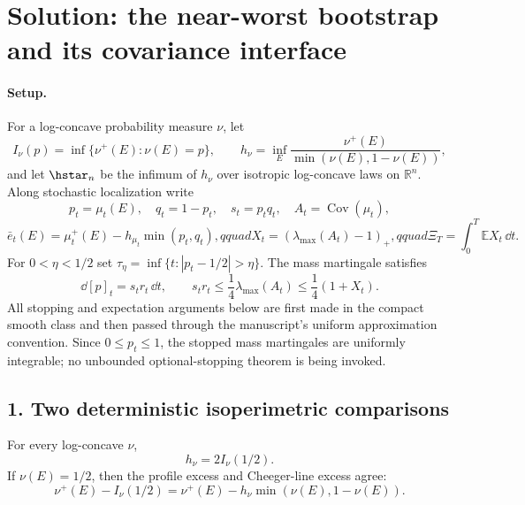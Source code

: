 \documentclass[../main.tex]{subfiles}
\begin{document}
%
\section*{Solution: the near-worst bootstrap and its covariance interface}
\label{sec:sol-kls-bootstrap-interface}

\paragraph{Setup.}
For a log-concave probability measure $\nu$, let
\[
  I_\nu(p)=\inf\{\nu^+(E):\nu(E)=p\},\qquad
  h_\nu=\inf_E\frac{\nu^+(E)}{\min(\nu(E),1-\nu(E))},
\]
and let $\hstar_n$ be the infimum of $h_\nu$ over isotropic log-concave laws on
$\mathbb R^n$.  Along stochastic localization write
\[
  p_t=\mu_t(E),\quad q_t=1-p_t,\quad s_t=p_tq_t,
  \quad A_t=\operatorname{Cov}(\mu_t),
\]
\[
  \bar e_t(E)=\mu_t^+(E)-h_{\mu_t}\min(p_t,q_t),qquad
  X_t=(\lambda_{\max}(A_t)-1)_+,qquad
  \Xi_T=\int_0^T\mathbb E X_t\,\dd t.
\]
For $0<\eta<1/2$ set
$\tau_\eta=\inf\{t:|p_t-1/2|>\eta\}$.  The mass martingale satisfies
\begin{equation}
  \dd[p]_t=s_t r_t\,\dd t,
  \qquad s_t r_t\leq\frac14\lambda_{\max}(A_t)
  \leq\frac14(1+X_t).
  \label{eq:sol-mass-qv-bound}
\end{equation}
All stopping and expectation arguments below are first made in the compact smooth class and
then passed through the manuscript's uniform approximation convention.  Since $0\leq p_t\leq1$,
the stopped mass martingales are uniformly integrable; no unbounded optional-stopping theorem is
being invoked.

\subsection*{1. Two deterministic isoperimetric comparisons}

\begin{lemma}
\label{lem:sol-half}
For every log-concave $\nu$,
\[
  h_\nu=2I_\nu(1/2).
\]
If $\nu(E)=1/2$, then the profile excess and Cheeger-line excess agree:
\[
  \nu^+(E)-I_\nu(1/2)
  =\nu^+(E)-h_\nu\min(\nu(E),1-\nu(E)).
\]
\end{lemma}
\end{document}

